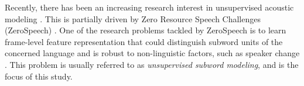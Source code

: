 \documentclass[a4paper]{article}
\begin{document}
Recently, there has been an increasing  research interest in unsupervised acoustic modeling \cite{chen2015parallel,heck2017feature,Kamper2017segmental,Tjandra2019,Feng2019combining,Ondel2019Bayesian}. This is partially driven by Zero Resource Speech Challenges (ZeroSpeech) \cite{versteegh2015zero,dunbar2017zero,Dunbar2019}.
One of the research problems tackled by ZeroSpeech is to learn frame-level feature representation that could distinguish subword units of the concerned language and is robust to non-linguistic factors, such as speaker change \cite{versteegh2015zero,dunbar2017zero}. This problem is usually referred to as \textit{unsupervised subword modeling}, and is the focus of this study. 

\end{document}
